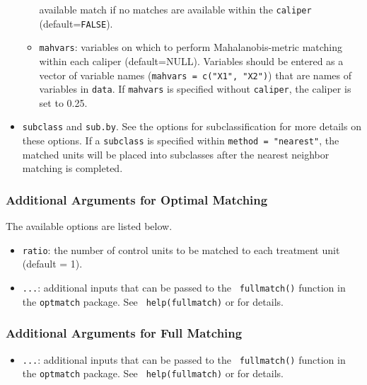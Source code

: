 \begin{itemize}
\begin{itemize}
    available match if no matches are available within the
    \texttt{caliper} (default={\tt FALSE}).
  \item \texttt{mahvars}: variables on which to perform
    Mahalanobis-metric matching within each caliper (default=NULL).
    Variables should be entered as a vector of variable names
    (\texttt{mahvars = c("X1", "X2")}) that are names of variables in
    \texttt{data}.  If \texttt{mahvars} is specified without
    \texttt{caliper}, the caliper is set to 0.25.
  \end{itemize}
\item \texttt{subclass} and \texttt{sub.by}.  See the options for
  subclassification for more details on these options.  If a
  \texttt{subclass} is specified within \texttt{method = "nearest"},
  the matched units will be placed into subclasses after the nearest
  neighbor matching is completed.
\end{itemize}

\subsubsection{Additional Arguments for Optimal Matching}
\label{subsubsec:inputs-optimal}

The available options are listed below.
\begin{itemize}
\item {\tt ratio}: the number of control units to be matched
  to each treatment unit (default = 1).
\item {\tt ...}: additional inputs that can be passed to the {\tt
    fullmatch()} function in the {\tt optmatch} package. See {\tt
    help(fullmatch)} or
  for details.
\end{itemize}

\subsubsection{Additional Arguments for Full Matching}
\label{subsubsec:inputs-full}

\begin{itemize}
\item {\tt ...}: additional inputs that can be passed to the {\tt
    fullmatch()} function in the {\tt optmatch} package. See {\tt
    help(fullmatch)} or
  for details.
\end{itemize}

